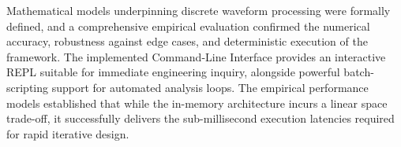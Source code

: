Mathematical models underpinning discrete waveform processing were formally defined, and a comprehensive empirical evaluation confirmed the numerical accuracy, robustness against edge cases, and deterministic execution of the framework. The implemented Command-Line Interface provides an interactive REPL suitable for immediate engineering inquiry, alongside powerful batch-scripting support for automated analysis loops. The empirical performance models established that while the in-memory architecture incurs a linear space trade-off, it successfully delivers the sub-millisecond execution latencies required for rapid iterative design.
